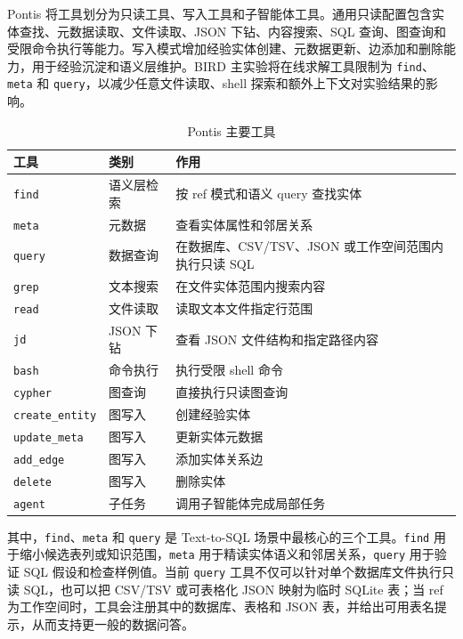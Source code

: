\documentclass[
    bachelor,
    pdflinks,
]{xjtuthesis}
\newcommand{\topcaption}[1]{\caption{#1}}
\begin{document}
Pontis 将工具划分为只读工具、写入工具和子智能体工具。通用只读配置包含实体查找、元数据读取、文件读取、JSON 下钻、内容搜索、SQL 查询、图查询和受限命令执行等能力。写入模式增加经验实体创建、元数据更新、边添加和删除能力，用于经验沉淀和语义层维护。BIRD 主实验将在线求解工具限制为 \texttt{find}、\texttt{meta} 和 \texttt{query}，以减少任意文件读取、shell 探索和额外上下文对实验结果的影响。

\begin{table}[htbp]\small
  \centering
  \topcaption{Pontis 主要工具}
  \label{tab:tools}
  \begin{tabularx}{\textwidth}{llX}
    \toprule[1.5pt]
    \textbf{工具} & \textbf{类别} & \textbf{作用} \\
    \midrule[1pt]
    \texttt{find} & 语义层检索 & 按 ref 模式和语义 query 查找实体 \\
    \texttt{meta} & 元数据 & 查看实体属性和邻居关系 \\
    \texttt{query} & 数据查询 & 在数据库、CSV/TSV、JSON 或工作空间范围内执行只读 SQL \\
    \texttt{grep} & 文本搜索 & 在文件实体范围内搜索内容 \\
    \texttt{read} & 文件读取 & 读取文本文件指定行范围 \\
    \texttt{jd} & JSON 下钻 & 查看 JSON 文件结构和指定路径内容 \\
    \texttt{bash} & 命令执行 & 执行受限 shell 命令 \\
    \texttt{cypher} & 图查询 & 直接执行只读图查询 \\
    \texttt{create\_entity} & 图写入 & 创建经验实体 \\
    \texttt{update\_meta} & 图写入 & 更新实体元数据 \\
    \texttt{add\_edge} & 图写入 & 添加实体关系边 \\
    \texttt{delete} & 图写入 & 删除实体 \\
    \texttt{agent} & 子任务 & 调用子智能体完成局部任务 \\
    \bottomrule[1.5pt]
  \end{tabularx}
\end{table}

其中，\texttt{find}、\texttt{meta} 和 \texttt{query} 是 Text-to-SQL 场景中最核心的三个工具。\texttt{find} 用于缩小候选表列或知识范围，\texttt{meta} 用于精读实体语义和邻居关系，\texttt{query} 用于验证 SQL 假设和检查样例值。当前 \texttt{query} 工具不仅可以针对单个数据库文件执行只读 SQL，也可以把 CSV/TSV 或可表格化 JSON 映射为临时 SQLite 表；当 ref 为工作空间时，工具会注册其中的数据库、表格和 JSON 表，并给出可用表名提示，从而支持更一般的数据问答。
\end{document}
